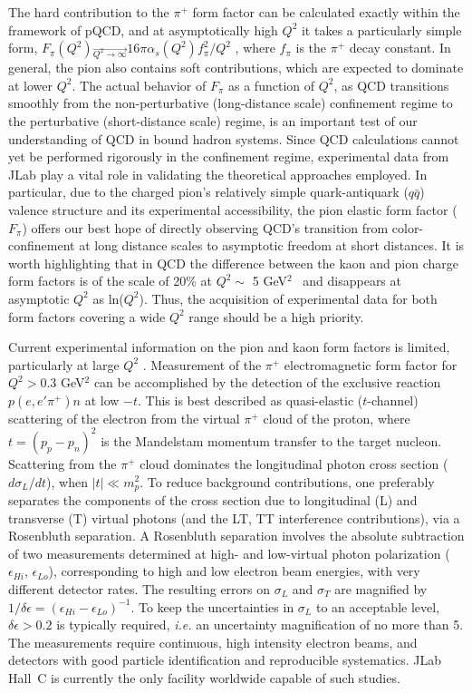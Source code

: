 \documentclass[letterpaper,12pt]{article}
\begin{document}
The hard contribution to the $\pi^+$ form factor can be calculated exactly
within the framework of pQCD, and at asymptotically high $Q^2$ it takes a
particularly simple form, $F_{\pi}(Q^2) \overrightarrow{_{Q^2 \rightarrow
\infty}} 16 \pi \alpha_s(Q^2)f_{\pi}^2/Q^2$ \cite{PETERLEPAGE1979359}, where $f_{\pi}$ is
the $\pi^+$ decay constant.  In general, the pion also contains soft
contributions, which are expected to dominate at lower $Q^2$.  The
actual behavior of $F_{\pi}$ as a function of $Q^2$, as QCD transitions smoothly
from the non-perturbative (long-distance scale) confinement regime to the
perturbative (short-distance scale) regime, is an important test of our
understanding of QCD in bound hadron systems.  Since QCD calculations cannot
yet be performed rigorously in the confinement regime, experimental data
from JLab play a vital role in validating the theoretical approaches employed.
In particular, due to the charged pion's relatively simple quark-antiquark ($q\bar{q}$)
valence structure and its
experimental accessibility, the pion elastic form factor ($F_{\pi}$) offers our best
hope of directly observing QCD's transition from color-confinement at
long distance scales to asymptotic freedom at short distances. 
It is worth highlighting that in QCD the difference between the kaon and pion charge form factors is of the scale of 20\% at $Q^2 \sim$ 5 GeV$^2$~\cite{Gao:2017mmp} and disappears at asymptotic $Q^2$ as ln($Q^2$).  Thus, the acquisition of experimental data for both form factors covering a wide $Q^2$ range should be a high priority.

Current experimental information
on the pion and kaon form factors is limited, particularly at large $Q^2$ \cite{Horn:2016rip}.
Measurement of the $\pi^+$ electromagnetic form factor for $Q^2>0.3$ GeV$^2$ can be accomplished by the detection of the exclusive reaction $p(e,e'\pi^+)n$ at low $-t$. 
This is best described as quasi-elastic ($t$-channel) scattering of the electron from the
virtual $\pi^+$ cloud of the proton, where $t=(p_{p}-p_{n})^2$ is the
Mandelstam momentum transfer to the target nucleon.
Scattering from the $\pi^+$ cloud dominates the longitudinal
photon cross section ($d\sigma_L/dt$),  when $|t|\ll m_p^2$.  To reduce background contributions, one preferably separates the
components of the cross section due to longitudinal (L) and transverse (T)
virtual photons (and the LT, TT interference contributions), via a Rosenbluth
separation.  
A
Rosenbluth separation involves the absolute subtraction of two measurements
determined at high- and low-virtual photon polarization ($\epsilon_{Hi}$,
$\epsilon_{Lo}$), corresponding to high and low electron beam energies, with
very different detector rates. The resulting errors on $\sigma_L$ and $\sigma_T$ are
magnified by $1/\delta\epsilon=(\epsilon_{Hi}-\epsilon_{Lo})^{-1}$.  To keep the uncertainties in
$\sigma_L$ to an acceptable level, $\delta\epsilon >0.2$ is typically required,
{\it i.e.} an uncertainty magnification of no more than 5.  
The measurements
require continuous, high intensity electron beams, and detectors
with good particle identification and reproducible systematics.
JLab Hall~C is currently the only facility worldwide capable of such studies.  
\end{document}
